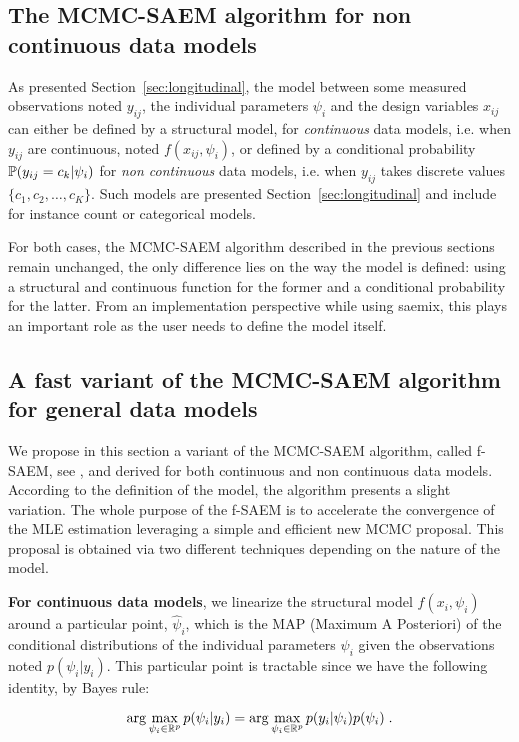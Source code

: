 \subsection{The MCMC-SAEM algorithm for non continuous data models}

As presented Section~\ref{sec:longitudinal}, the model between some measured observations noted $y_{ij}$, the individual parameters $\psi_i$ and the design variables $x_{ij}$ can either be defined by a structural model, for \emph{continuous} data models, i.e. when $y_{ij}$ are continuous, noted $f(x_{ij}, \psi_i)$, or defined by a conditional probability $\mathbb{P}(y_{ij}=c_k|\psi_i)$ for \emph{non continuous} data models, i.e. when $y_{ij}$ takes discrete values $\{c_1, c_2,\ldots , c_K\}$. Such models are presented Section~\ref{sec:longitudinal} and include for instance count or categorical models.

For both cases, the MCMC-SAEM algorithm described in the previous sections remain unchanged, the only difference lies on the way the model is defined: using a structural and continuous function for the former and a conditional probability for the latter. From an implementation perspective while using saemix, this plays an important role as the user needs to define the model itself.

\subsection{A fast variant of the MCMC-SAEM algorithm for general data models}\label{subsec:fsaem}

We propose in this section a variant of the MCMC-SAEM algorithm, called f-SAEM, see \cite{Karimi19}, and derived for both continuous and non continuous data models.
According to the definition of the model, the algorithm presents a slight variation.
The whole purpose of the f-SAEM is to accelerate the convergence of the MLE estimation leveraging a simple and efficient new MCMC proposal.
This proposal is obtained via two different techniques depending on the nature of the model.

\textbf{For continuous data models}, we linearize the structural model $f(x_{i}, \psi_i)$ around a particular point, $\hat{\psi}_i$, which is the MAP (Maximum A Posteriori) of the conditional distributions of the individual parameters $\psi_i$ given the observations noted $p(\psi_i|y_i) $. This particular point is tractable since we have the following identity, by Bayes rule:

\begin{equation}
\arg \max \limits_{\psi_i \in \mathbb{R}^p} p(\psi_i|y_i) = \arg \max \limits_{\psi_i \in \mathbb{R}^p} p(y_i|\psi_i)p(\psi_i) \;.
\end{equation}

